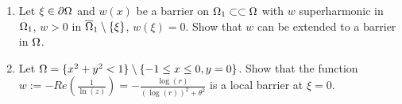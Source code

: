 \begin{enumerate}
\item
  Let $\xi \in \partial \Omega$ and $w(x)$ be a barrier on $\Omega_1 \subset \subset \Omega$ with $w$ superharmonic in $\Omega_1$, $w > 0$
  in $\overline{\Omega}_1 \setminus \{ \xi \}$, $w(\xi) = 0$.
  Show that $w$ can be extended to a barrier in $\Omega$.
\item
  Let $\Omega = \{ x^2 + y^2 < 1 \} \setminus \{ -1 \leq x \leq 0, y = 0 \}$.
  Show that the function $w := -Re\left( \frac{1}{\ln(z)} \right) = - \frac{\log(r)}{(\log(r))^2 + \theta^2}$ is a local barrier at $\xi = 0$.
\end{enumerate}

